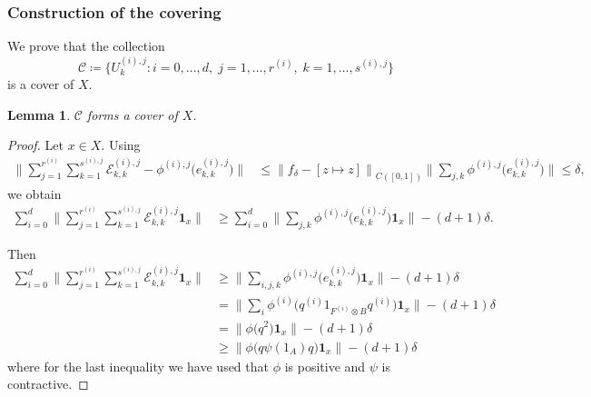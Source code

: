 \documentclass[a4paper]{amsart}
\numberwithin{equation}{section}
\newcommand{\Ecal}{\mathcal{E}}
\newcommand{\indF}{\mathbf{1}}
\newcommand{\cont}[1]{C({#1})}
\newcommand{\prn}[1]{{(#1)}}
\newcommand{\normBig}[1]{{\Big\lVert #1 \Big \rVert}}
\newcommand{\unMatImg}[3]{{\Ecal_{#3}^{(#1), #2}}}
\theoremstyle{plain}
\newtheorem{lem}[thm]{Lemma}
\theoremstyle{indented}
\numberwithin{equation}{section}
\theoremstyle{definition}
\theoremstyle{remark}
\theoremstyle{plain}
\theoremstyle{definition}
\begin{document}
\smallskip
\subsubsection{Construction of the covering}
    We prove that the collection
    \begin{equation*}
        {\mathcal{C}} \coloneq \Big\{ {U}^{(i),j}_k \colon i = 0,\hdots,d, \; j= 1,\hdots,r^{(i)},\; k=1,\hdots,s^{(i),j} \Big\}
    \end{equation*}
    is a cover of $X$.

    \begin{lem} \label{lem:coverAsdim}
        ${\mathcal{C}}$ forms a cover of $X$.
    \end{lem}
    \begin{proof}
        Let $x \in X$. 
        Using
        \begin{align*}
            \normBig{   \sum_{j =1 }^{r^{(i)}} \sum_{k =1 }^{s^{(i),j}} \unMatImg{i}{j}{k,k} - 
            {\phi^{(i),j}}\big({e_{k,k}^{(i),j}} \big)} 
            & \le \normBig{f_\delta - [z\mapsto z]}_{\cont{[0,1]}} \normBig{  \sum_{j,k } {\phi^{(i),j}}\big({e_{k,k}^{(i),j}} \big)}
            \le \delta,
        \end{align*}  
        we obtain
        \begin{align*}
            \sum_{i=0}^d \normBig{ \sum_{j =1 }^{r^{(i)}} \sum_{k =1 }^{s^{(i),j}}
             \unMatImg{i}{j}{k,k}  \indF_x }
             & \ge \sum_{i=0}^d \normBig{ \sum_{j,k }
            {\phi^{(i),j}}\big({e_{k,k}^{(i),j}} \big)\indF_x }  - (d+1)\delta.
        \end{align*}
        
    Then 
    \begin{align*}
            \sum_{i=0}^d  \normBig{ \sum_{j =1 }^{r^{(i)}} \sum_{k =1 }^{s^{(i),j}}
           \unMatImg{i}{j}{k,k} \indF_x }
             & \ge  \normBig{ \sum_{i, j,k }
            {\phi^{(i),j}}\big({e_{k,k}^{(i),j}} \big)\indF_x }  - (d+1)\delta\\
            & =  \normBig{ \sum_{i }
            {\phi^{(i)}}\big( q^{\prn{i}} 1_{F^{(i)}\otimes B} q^{\prn{i}}\big)\indF_x }  - (d+1)\delta\\
             & =  \normBig{ \phi \big( q^2 \big)\indF_x }  - (d+1)\delta\\
              & \ge  \normBig{ \phi \big( q \psi(1_A) q\big)\indF_x }  - (d+1)\delta
        \end{align*}
        where for the last inequality we have used that $\phi$ is positive and $\psi$ is contractive. 
        

\end{proof}
\end{document}

